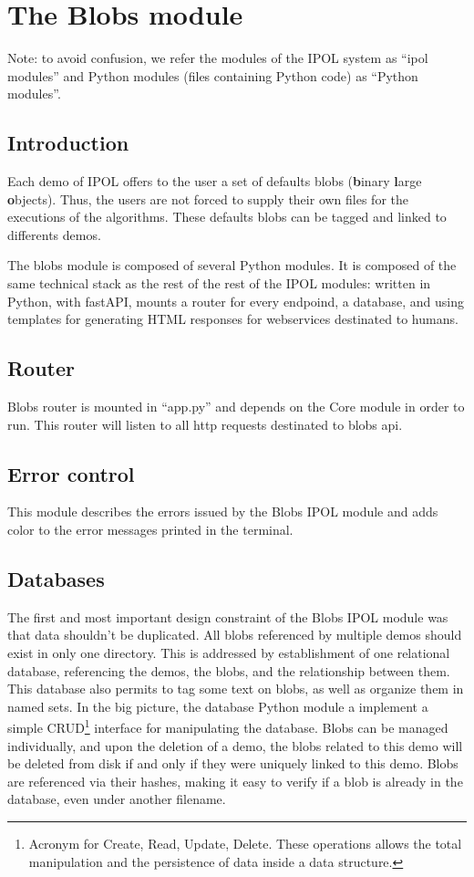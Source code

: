 \section{The Blobs module}

Note: to avoid confusion, we refer the modules of the IPOL system as ``ipol modules'' and Python modules (files containing Python code) as ``Python modules''.

\subsection{Introduction}
Each demo of IPOL offers to the user a set of defaults blobs (\textbf{b}inary \textbf{l}arge \textbf{o}bjects). Thus, the users are not forced to supply their own files for the executions of the algorithms. These defaults blobs can be tagged and linked to differents demos.

The blobs module is composed of several Python modules. It is composed of the same technical stack as the rest of the rest of the IPOL modules: written in Python, with fastAPI, mounts a router for every endpoind, a database, and using templates for generating HTML responses for webservices destinated to humans.

\subsection{Router}
Blobs router is mounted in ``app.py'' and depends on the Core module in order to run. This router will listen to all http requests  destinated to blobs api.

\subsection{Error control}
This module describes the errors issued by the Blobs IPOL module and adds color to the error messages printed in the terminal.

\subsection{Databases}
The first and most important design constraint of the Blobs IPOL module was that data shouldn't be duplicated. All blobs referenced by multiple demos should exist in only one directory. This is addressed by establishment of one relational database, referencing the demos, the blobs, and the relationship between them. This database also permits to tag some text on blobs, as well as organize them in named sets. In the big picture, the database Python module a implement a simple CRUD\footnote{Acronym for Create, Read, Update, Delete. These operations allows the total manipulation and the persistence of data inside a data structure.} interface for manipulating the database. Blobs can be managed individually, and upon the deletion of a demo, the blobs related to this demo will be deleted from disk if and only if they were uniquely linked to this demo. Blobs are referenced via their hashes, making it easy to verify if a blob is already in the database, even under another filename. \\

